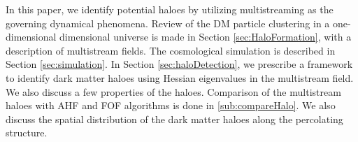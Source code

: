 \documentclass[fleqn,usenatbib,useAMS]{mnras}
\newcommand\hl{\bgroup\markoverwith
  {\textcolor{yellow}{\rule[-.5ex]{2pt}{2.5ex}}}\ULon}
\newcommand\rhl{\bgroup\markoverwith
  {\textcolor{orange}{\rule[-.5ex]{2pt}{2.5ex}}}\ULon}
\begin{document}

 



In this paper, we identify potential haloes by utilizing multistreaming as the governing dynamical phenomena. Review of the DM particle clustering in a one-dimensional dimensional universe is made in Section \ref{sec:HaloFormation}, with a description of multistream fields. The cosmological simulation is described in Section \ref{sec:simulation}. In Section \ref{sec:haloDetection}, we prescribe a framework to identify dark matter haloes using Hessian eigenvalues in the multistream field. We also discuss a few properties of the haloes. Comparison of the multistream haloes with AHF and FOF algorithms is done in \ref{sub:compareHalo}. We also discuss the spatial distribution of the dark matter haloes along the percolating structure.
%
\end{document}
